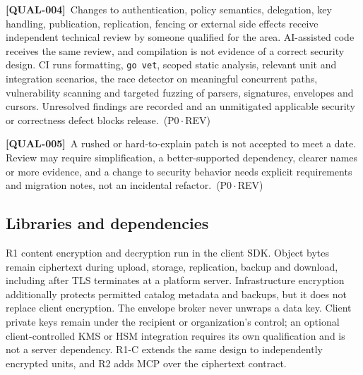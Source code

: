 \documentclass[11pt,a4paper]{article}
\newcommand{\code}[1]{{\small\nolinkurl{#1}}}
\newcommand{\reqtag}[2]{{\footnotesize\color{accent}(#1\,$\cdot$\,#2)}}
\newcommand{\req}[4]{\par\noindent\hypertarget{req:#1}{\textbf{[#1]}}\ #4\ \reqtag{#2}{#3}\par}
\begin{document}
\req{QUAL-004}{P0}{REV}{Changes to authentication, policy semantics, delegation, key handling, publication, replication, fencing or external side effects receive independent technical review by someone qualified for the area. AI-assisted code receives the same review, and compilation is not evidence of a correct security design. CI runs formatting, \code{go vet}, scoped static analysis, relevant unit and integration scenarios, the race detector on meaningful concurrent paths, vulnerability scanning and targeted fuzzing of parsers, signatures, envelopes and cursors. Unresolved findings are recorded and an unmitigated applicable security or correctness defect blocks release.}
\req{QUAL-005}{P0}{REV}{A rushed or hard-to-explain patch is not accepted to meet a date. Review may require simplification, a better-supported dependency, clearer names or more evidence, and a change to security behavior needs explicit requirements and migration notes, not an incidental refactor.}

\subsection{Libraries and dependencies}
R1 content encryption and decryption run in the client SDK. Object bytes remain ciphertext during upload, storage, replication, backup and download, including after TLS terminates at a platform server. Infrastructure encryption additionally protects permitted catalog metadata and backups, but it does not replace client encryption. The envelope broker never unwraps a data key. Client private keys remain under the recipient or organization's control; an optional client-controlled KMS or HSM integration requires its own qualification and is not a server dependency. R1-C extends the same design to independently encrypted units, and R2 adds MCP over the ciphertext contract.
\end{document}

